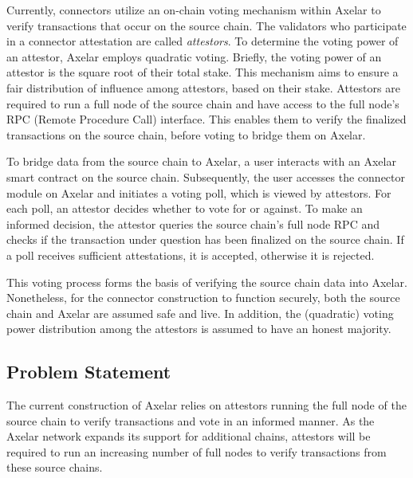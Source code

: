 Currently, connectors utilize an on-chain voting mechanism within Axelar to verify transactions that occur on the source chain. The validators who participate in a connector attestation are called \emph{attestors}. To determine the voting power of an attestor, Axelar employs quadratic voting. Briefly, the voting power of an attestor is the square root of their total stake. This mechanism aims to ensure a fair distribution of influence among attestors, based on their stake. Attestors are required to run a full node of the source chain and have access to the full node's RPC (Remote Procedure Call) interface. This enables them to verify the finalized transactions on the source chain, before voting to bridge them on Axelar.

To bridge data from the source chain to Axelar, a user interacts with an Axelar smart contract on the source chain. Subsequently, the user accesses the connector module on Axelar and initiates a voting poll, which is viewed by attestors. For each poll, an attestor decides whether to vote for or against. To make an informed decision, the attestor queries the source chain's full node RPC and checks if the
transaction under question has been finalized on the source chain. If a poll receives sufficient attestations, it is accepted, otherwise it is rejected.

This voting process forms the basis of verifying the source chain data into Axelar.
Nonetheless, for the connector construction to function securely, both the source chain and Axelar are assumed safe and live. In addition, the (quadratic) voting power distribution among the attestors is assumed to have an honest majority.

\subsection{Problem Statement}
The current construction of Axelar relies on attestors running the full node of
the source chain to verify transactions and vote in an informed manner.
As the Axelar network expands its support for additional chains,
attestors will be required to run an increasing number of full nodes to verify
transactions from these source chains.

